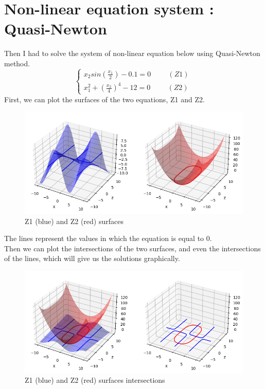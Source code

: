\section{Non-linear equation system : Quasi-Newton}
Then I had to solve the system of non-linear equation below using Quasi-Newton method.
\begin{equation}
    \begin{cases}
        x_2 sin (\frac{x_1}{2}) - 0.1 = 0 \hspace{1cm}(Z1)\\
        x_1^2 + (\frac{x_2}{4})^4 - 12 = 0 \hspace{1cm}(Z2)
\end{cases}\,
\end{equation}
First, we can plot the surfaces of the two equations, Z1 and Z2.\\
\begin{figure}[H]
    \centering
    \includegraphics[width=14cm]{images/surfacesrepresntations.png}
    \caption{Z1 (blue) and Z2 (red) surfaces}
    \label{fig:surfacesplots}
\end{figure}
The lines represent the values in which the equation is equal to 0.\\
Then we can plot the intersections of the two surfaces, and even the intersections of the lines, which will give us the solutions graphically.
\begin{figure}[H]
    \centering
    \includegraphics[width=14cm]{images/solutionrepresentations.png}
    \caption{Z1 (blue) and Z2 (red) surfaces intersections}
    \label{fig:solutionsplots}
\end{figure}

